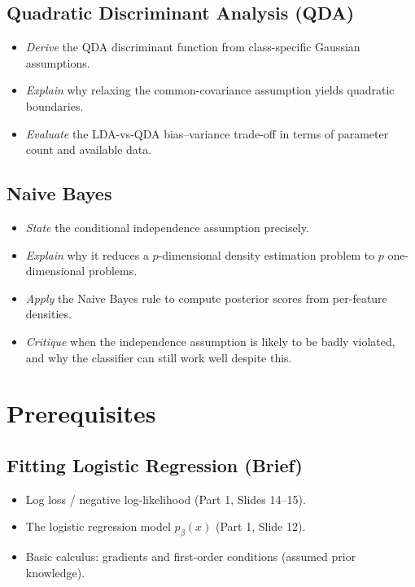 \documentclass[11pt]{article}
\begin{document}
\subsection{Quadratic Discriminant Analysis (QDA)}
\begin{itemize}
\item \emph{Derive} the QDA discriminant function from class-specific Gaussian assumptions.
\item \emph{Explain} why relaxing the common-covariance assumption yields quadratic boundaries.
\item \emph{Evaluate} the LDA-vs-QDA bias--variance trade-off in terms of parameter count and available data.
\end{itemize}

\subsection{Naive Bayes}
\begin{itemize}
\item \emph{State} the conditional independence assumption precisely.
\item \emph{Explain} why it reduces a $p$-dimensional density estimation problem to $p$ one-dimensional problems.
\item \emph{Apply} the Naive Bayes rule to compute posterior scores from per-feature densities.
\item \emph{Critique} when the independence assumption is likely to be badly violated, and why the classifier can still work well despite this.
\end{itemize}

\section{Prerequisites}

\subsection{Fitting Logistic Regression (Brief)}
\begin{itemize}
\item Log loss / negative log-likelihood (Part 1, Slides 14--15).
\item The logistic regression model $p_\beta(x)$ (Part 1, Slide 12).
\item Basic calculus: gradients and first-order conditions (assumed prior knowledge).
\end{itemize}
\end{document}
